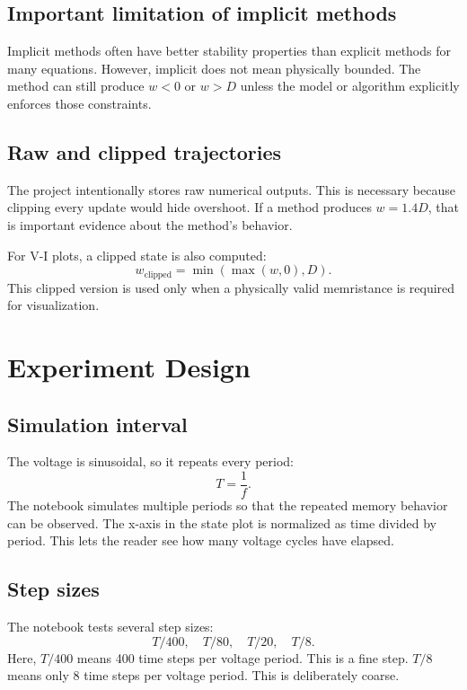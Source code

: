 \documentclass[11pt]{article}
\begin{document}
\subsection{Important limitation of implicit methods}

Implicit methods often have better stability properties than explicit methods for many equations. However, implicit does not mean physically bounded. The method can still produce \(w<0\) or \(w>D\) unless the model or algorithm explicitly enforces those constraints.

\subsection{Raw and clipped trajectories}

The project intentionally stores raw numerical outputs. This is necessary because clipping every update would hide overshoot. If a method produces \(w=1.4D\), that is important evidence about the method's behavior.

For V-I plots, a clipped state is also computed:
\[
w_{\text{clipped}} = \min(\max(w,0),D).
\]
This clipped version is used only when a physically valid memristance is required for visualization.

\section{Experiment Design}

\subsection{Simulation interval}

The voltage is sinusoidal, so it repeats every period:
\[
T = \frac{1}{f}.
\]
The notebook simulates multiple periods so that the repeated memory behavior can be observed. The x-axis in the state plot is normalized as time divided by period. This lets the reader see how many voltage cycles have elapsed.

\subsection{Step sizes}

The notebook tests several step sizes:
\[
T/400,\quad T/80,\quad T/20,\quad T/8.
\]
Here, \(T/400\) means 400 time steps per voltage period. This is a fine step. \(T/8\) means only 8 time steps per voltage period. This is deliberately coarse.
\end{document}
